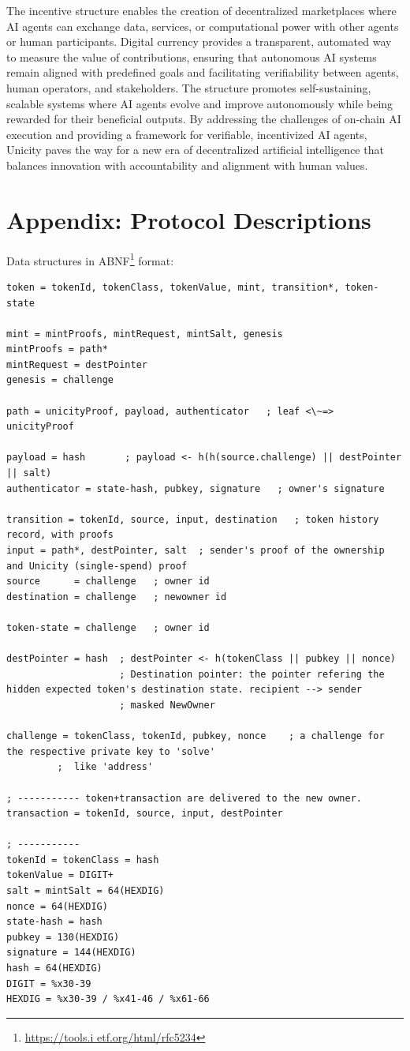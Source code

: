 \documentclass{article}
\begin{document}
The incentive structure  enables the creation of decentralized marketplaces where AI agents can exchange data, services, or computational power with other agents or human participants. Digital currency provides a transparent, automated way to measure the value of contributions, ensuring that autonomous AI systems remain aligned with predefined goals and facilitating verifiability between agents, human operators, and stakeholders. The structure promotes self-sustaining, scalable systems where AI agents evolve and improve autonomously while being rewarded for their beneficial outputs. By addressing the challenges of on-chain AI execution and providing a framework for verifiable, incentivized AI agents, Unicity paves the way for a new era of decentralized artificial intelligence that balances innovation with accountability and alignment with human values.


\section{Appendix: Protocol Descriptions}




Data structures in ABNF\footnote{\url{https://tools.i
etf.org/html/rfc5234}} format:

\begin{lstlisting}[language=abnf]
token = tokenId, tokenClass, tokenValue, mint, transition*, token-state

mint = mintProofs, mintRequest, mintSalt, genesis
mintProofs = path*
mintRequest = destPointer
genesis = challenge

path = unicityProof, payload, authenticator   ; leaf <\~=> unicityProof

payload = hash       ; payload <- h(h(source.challenge) || destPointer || salt)
authenticator = state-hash, pubkey, signature   ; owner's signature

transition = tokenId, source, input, destination   ; token history record, with proofs
input = path*, destPointer, salt  ; sender's proof of the ownership and Unicity (single-spend) proof
source      = challenge   ; owner id
destination = challenge   ; newowner id

token-state = challenge   ; owner id

destPointer = hash  ; destPointer <- h(tokenClass || pubkey || nonce)
                    ; Destination pointer: the pointer refering the hidden expected token's destination state. recipient --> sender
                    ; masked NewOwner

challenge = tokenClass, tokenId, pubkey, nonce    ; a challenge for the respective private key to 'solve'
         ;  like 'address'

; ----------- token+transaction are delivered to the new owner.
transaction = tokenId, source, input, destPointer

; -----------
tokenId = tokenClass = hash
tokenValue = DIGIT+
salt = mintSalt = 64(HEXDIG)
nonce = 64(HEXDIG)
state-hash = hash
pubkey = 130(HEXDIG)
signature = 144(HEXDIG)
hash = 64(HEXDIG)
DIGIT = %x30-39
HEXDIG = %x30-39 / %x41-46 / %x61-66
\end{lstlisting}
\end{document}
